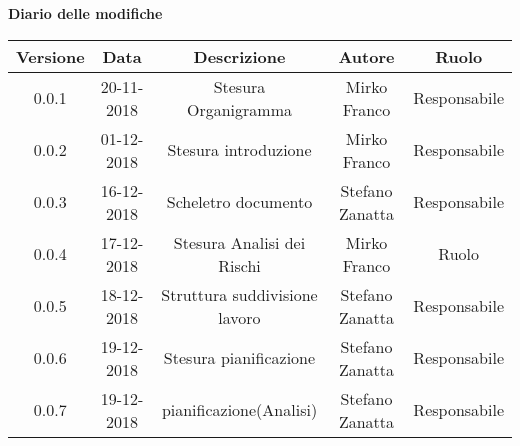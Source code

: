 	\begin{center}
		\textbf{Diario delle modifiche}
	\end{center}
	\begin{center}
		\begin{tabular}{|c|c|c|c|c|}
			\hline
			\textbf{Versione} & \textbf{Data} & \textbf{Descrizione} & \textbf{Autore} & \textbf{Ruolo} \\
			\hline
			0.0.1 & 20-11-2018 & Stesura Organigramma & Mirko Franco & Responsabile\\
			\hline
			0.0.2 & 01-12-2018 & Stesura introduzione & Mirko Franco & Responsabile\\
			\hline
			0.0.3 & 16-12-2018 & Scheletro documento &Stefano Zanatta & Responsabile\\
			\hline
			0.0.4 & 17-12-2018 & Stesura Analisi dei Rischi & Mirko Franco & Ruolo\\
			\hline
			0.0.5 & 18-12-2018 & Struttura suddivisione lavoro & Stefano Zanatta & Responsabile\\
			\hline
			0.0.6 & 19-12-2018 & Stesura pianificazione & Stefano Zanatta & Responsabile\\
			\hline
			0.0.7 & 19-12-2018 & pianificazione(Analisi) & Stefano Zanatta & Responsabile\\
			\hline
			
		\end{tabular}
	\end{center}
\newpage